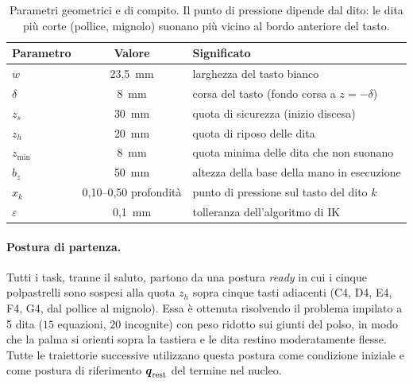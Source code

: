 \begin{table}[htbp]
    \centering
    \renewcommand{\arraystretch}{1.1}
    \begin{tabular}{|l|c|l|}
        \hline
        Parametro & Valore & Significato\\ \hline \hline
        $w$ & 23,5~mm & larghezza del tasto bianco\\
        $\delta$ & 8~mm & corsa del tasto (fondo corsa a $z=-\delta$)\\
        $z_s$ & 30~mm & quota di sicurezza (inizio discesa)\\
        $z_h$ & 20~mm & quota di riposo delle dita \\
        $z_{\min}$ & 8~mm & quota minima delle dita che non suonano\\
        $b_z$ & 50~mm & altezza della base della mano in esecuzione\\
        $x_k$ & 0,10--0,50 profondit\`a & punto di pressione sul tasto del dito $k$\\
        $\varepsilon$ & 0,1~mm & tolleranza dell'algoritmo di IK\\ \hline
    \end{tabular}
    \caption{Parametri geometrici e di compito. Il punto di pressione dipende dal dito: le dita pi\`u corte (pollice, mignolo) suonano pi\`u vicino al bordo anteriore del tasto.}
    \label{tab:task_params}
\end{table}

\paragraph{Postura di partenza.} Tutti i task, tranne il saluto, partono da una postura \textit{ready} in cui i cinque polpastrelli sono sospesi alla quota $z_h$ sopra cinque tasti adiacenti (C4, D4, E4, F4, G4, dal pollice al mignolo). Essa è ottenuta risolvendo il problema impilato a 5 dita ($15$ equazioni, $20$ incognite) con peso ridotto sui giunti del polso, in modo che la palma si orienti sopra la tastiera e le dita restino moderatamente flesse. Tutte le traiettorie successive utilizzano questa postura come condizione iniziale e come postura di riferimento $\boldsymbol q_{\rm rest}$ del termine nel nucleo.

